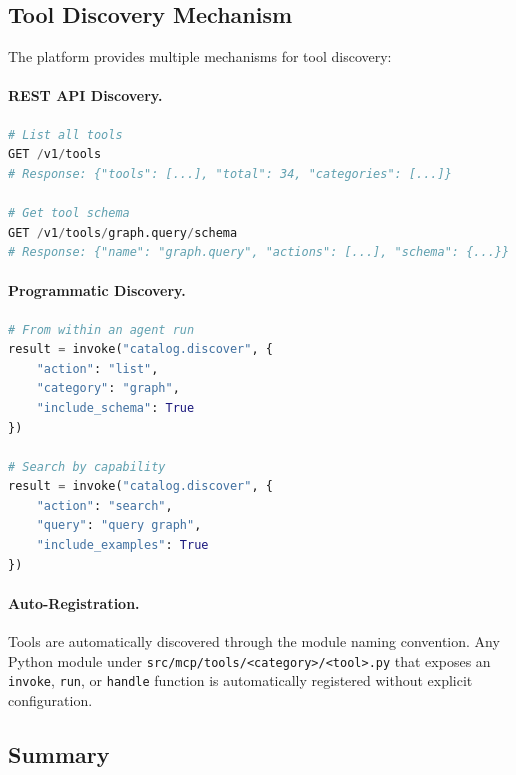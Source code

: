 \subsection{Tool Discovery Mechanism}
\label{subsec:discovery-mechanism}

The platform provides multiple mechanisms for tool discovery:

\paragraph{REST API Discovery.}
\begin{lstlisting}[language=Python, caption={Tool discovery via REST API}, label={lst:rest-discovery}]
# List all tools
GET /v1/tools
# Response: {"tools": [...], "total": 34, "categories": [...]}

# Get tool schema
GET /v1/tools/graph.query/schema
# Response: {"name": "graph.query", "actions": [...], "schema": {...}}
\end{lstlisting}

\paragraph{Programmatic Discovery.}
\begin{lstlisting}[language=Python, caption={Tool discovery via catalog.discover}, label={lst:programmatic-discovery}]
# From within an agent run
result = invoke("catalog.discover", {
    "action": "list",
    "category": "graph",
    "include_schema": True
})

# Search by capability
result = invoke("catalog.discover", {
    "action": "search",
    "query": "query graph",
    "include_examples": True
})
\end{lstlisting}

\paragraph{Auto-Registration.}
Tools are automatically discovered through the module naming convention. Any Python module under \texttt{src/mcp/tools/<category>/<tool>.py} that exposes an \texttt{invoke}, \texttt{run}, or \texttt{handle} function is automatically registered without explicit configuration.

\subsection{Summary}
\label{subsec:inventory-summary}

